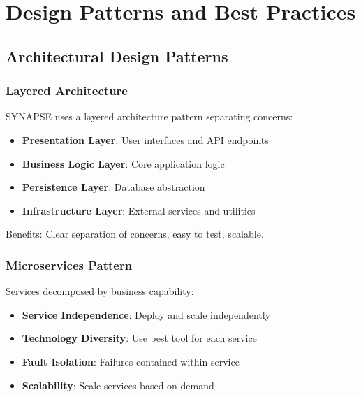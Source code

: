 \documentclass[12pt,a4paper]{report}
\begin{document}
\newpage

\chapter{Design Patterns and Best Practices}

\section{Architectural Design Patterns}

\subsection{Layered Architecture}

SYNAPSE uses a layered architecture pattern separating concerns:

\begin{itemize}[label=\textbullet]
    \item \textbf{Presentation Layer}: User interfaces and API endpoints
    \item \textbf{Business Logic Layer}: Core application logic
    \item \textbf{Persistence Layer}: Database abstraction
    \item \textbf{Infrastructure Layer}: External services and utilities
\end{itemize}

Benefits: Clear separation of concerns, easy to test, scalable.

\subsection{Microservices Pattern}

Services decomposed by business capability:

\begin{itemize}[label=\textbullet]
    \item \textbf{Service Independence}: Deploy and scale independently
    \item \textbf{Technology Diversity}: Use best tool for each service
    \item \textbf{Fault Isolation}: Failures contained within service
    \item \textbf{Scalability}: Scale services based on demand
\end{itemize}
\end{document}
